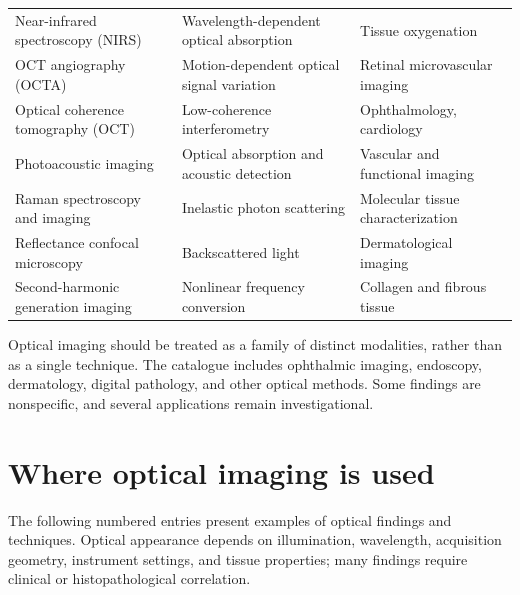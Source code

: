 \begin{center}
\begin{tabular}{@{}p{}p{}p{}@{}}
Near-infrared spectroscopy (NIRS) & Wavelength-dependent optical absorption & Tissue oxygenation \\
OCT angiography (OCTA) & Motion-dependent optical signal variation & Retinal microvascular imaging \\
Optical coherence tomography (OCT) & Low-coherence interferometry & Ophthalmology, cardiology \\
Photoacoustic imaging & Optical absorption and acoustic detection & Vascular and functional imaging \\
Raman spectroscopy and imaging & Inelastic photon scattering & Molecular tissue characterization \\
Reflectance confocal microscopy & Backscattered light & Dermatological imaging \\
Second-harmonic generation imaging & Nonlinear frequency conversion & Collagen and fibrous tissue \\
\bottomrule
\end{tabular}
\end{center}

Optical imaging should be treated as a family of distinct modalities, rather than as a single technique. The catalogue includes ophthalmic imaging, endoscopy, dermatology, digital pathology, and other optical methods. Some findings are nonspecific, and several applications remain investigational.

\section{Where optical imaging is used}
The following numbered entries present examples of optical findings and techniques. Optical appearance depends on illumination, wavelength, acquisition geometry, instrument settings, and tissue properties; many findings require clinical or histopathological correlation.

